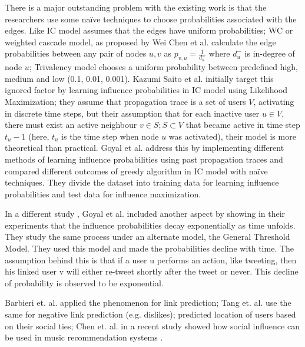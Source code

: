		There is a major outstanding problem with the existing work is that the researchers use some naïve techniques to choose probabilities associated with the edges. Like IC model assumes that the edges have uniform probabilities; WC or weighted cascade model, as proposed by Wei Chen et al. \cite{chen2010} calculate the edge probabilities between any pair of nodes $u,v$ as $p_{v,u}=\frac{1}{d^{-}_{u}}$ where $d^{-}_{u}$ is in-degree of node $u$; Trivalency model chooses a uniform probability between predefined high, medium and low (0.1, 0.01, 0.001). Kazumi Saito et al. \cite{saito2008} initially target this ignored factor by learning influence probabilities in IC model using Likelihood Maximization; they assume that propagation trace is a set of users $V$, activating in discrete time steps, but their assumption that for each inactive user $u\in V$, there must exist an active neighbour $v\in S;S\subset V$ that became active in time step $t_{u}-1$ (here, $t_u$ is the time step when node $u$ was activated), their model is more theoretical than practical. Goyal et al. \cite{goyal2011} address this by implementing different methods of learning influence probabilities using past propagation traces and compared different outcomes of greedy algorithm in IC model with naïve techniques. They divide the dataset into training data for learning influence probabilities and test data for influence maximization.
		
		In a different study \cite{goyal2010}, Goyal et al. included another aspect by showing in their experiments that the influence probabilities decay exponentially as time unfolds. They study the same process under an alternate model, the General Threshold Model. They used this model and made the probabilities decline with time. The assumption behind this is that if a user u performs an action, like tweeting, then his linked user v will either re-tweet shortly after the tweet or never. This decline of probability is observed to be exponential.

		Barbieri et. al. \cite{barbieri2014,martinvcic2017} applied the phenomenon for link prediction; Tang et. al. \cite{tang2015b} use the same for negative link prediction (e.g. dislikes); \cite{mcgee2013} predicted location of users based on their social ties; Chen et. al. in a recent study showed how social influence can be used in music recommendation systems \cite{chen2019}.
		
